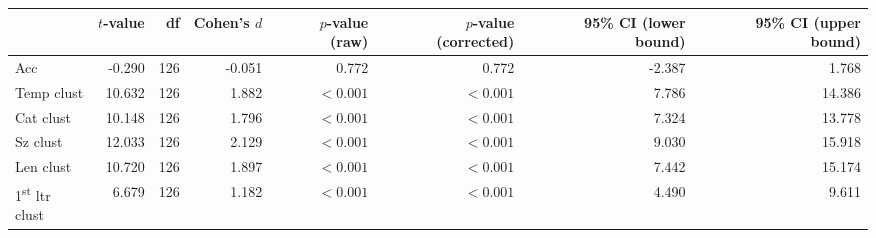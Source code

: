 \begin{tabular}{lrrrrrrr}
\toprule
{} & $t$-value &  df & Cohen's $d$ & $p$-value (raw) & $p$-value (corrected) & 95\% CI (lower bound) & 95\% CI (upper bound) \\
\midrule
Acc                             &    -0.290 & 126 &      -0.051 &           0.772 &                 0.772 &                -2.387 &                 1.768 \\
Temp clust                      &    10.632 & 126 &       1.882 &       $< 0.001$ &             $< 0.001$ &                 7.786 &                14.386 \\
Cat clust                       &    10.148 & 126 &       1.796 &       $< 0.001$ &             $< 0.001$ &                 7.324 &                13.778 \\
Sz clust                        &    12.033 & 126 &       2.129 &       $< 0.001$ &             $< 0.001$ &                 9.030 &                15.918 \\
Len clust                       &    10.720 & 126 &       1.897 &       $< 0.001$ &             $< 0.001$ &                 7.442 &                15.174 \\
1\textsuperscript{st} ltr clust &     6.679 & 126 &       1.182 &       $< 0.001$ &             $< 0.001$ &                 4.490 &                 9.611 \\
\bottomrule
\end{tabular}
